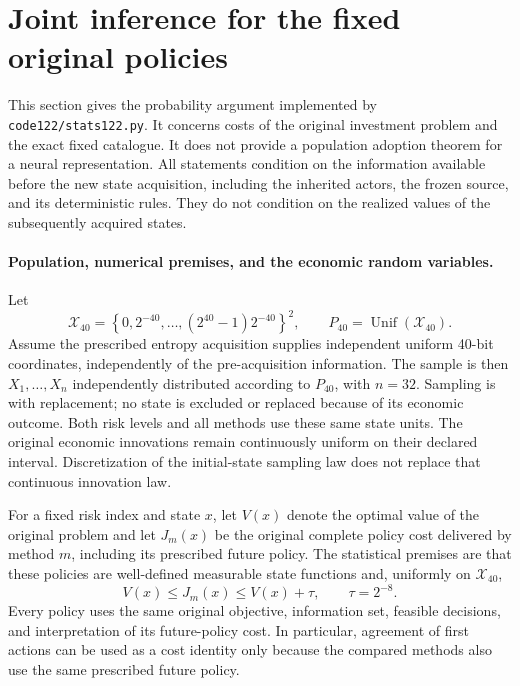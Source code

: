 \section{Joint inference for the fixed original policies}
\label{sec:inference122}

This section gives the probability argument implemented by
\texttt{code122/stats122.py}. It concerns costs of the original investment
problem and the exact fixed catalogue. It does not provide a population
adoption theorem for a neural representation. All statements condition on
the information available before the new state acquisition, including the
inherited actors, the frozen source, and its deterministic rules. They do
not condition on the realized values of the subsequently acquired states.

\paragraph{Population, numerical premises, and the economic random variables.}
Let
\[
 \mathcal{X}_{40}=
 \left\{0,2^{-40},\ldots,(2^{40}-1)2^{-40}\right\}^{2},
 \qquad P_{40}=\operatorname{Unif}(\mathcal{X}_{40}).
\]
Assume the prescribed entropy acquisition supplies independent uniform
40-bit coordinates, independently of the pre-acquisition information.
The sample is then \(X_1,\ldots,X_n\) independently distributed according
to \(P_{40}\), with \(n=32\). Sampling is with replacement; no state is
excluded or replaced because of its economic outcome. Both risk levels
and all methods use these same state units. The original economic
innovations remain continuously uniform on their declared interval.
Discretization of the initial-state sampling law does not replace that
continuous innovation law.

For a fixed risk index and state \(x\), let \(V(x)\) denote the optimal
value of the original problem and let \(J_m(x)\) be the original complete
policy cost delivered by method \(m\), including its prescribed future
policy. The statistical premises are that these policies are
well-defined measurable state functions and, uniformly on
\(\mathcal{X}_{40}\),
\begin{equation}
 V(x)\le J_m(x)\le V(x)+\tau,\qquad \tau=2^{-8}.
 \label{eq:inference-support122}
\end{equation}
Every policy uses the same original objective, information set, feasible
decisions, and interpretation of its future-policy cost. In particular,
agreement of first actions can be used as a cost identity only because
the compared methods also use the same prescribed future policy.

